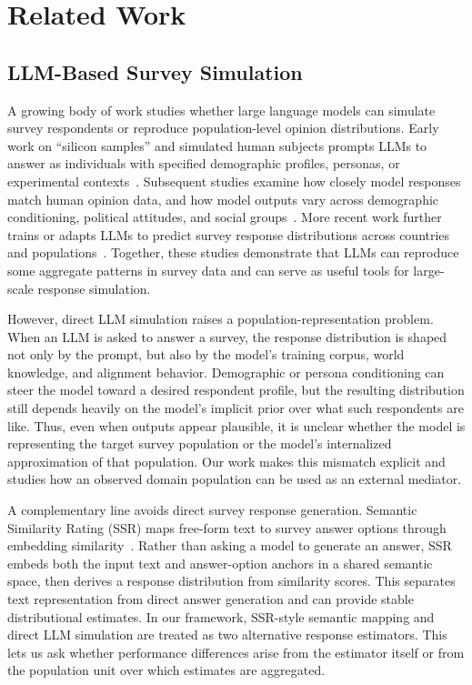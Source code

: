 \documentclass{article}
\begin{document}
\section{Related Work}

\subsection{LLM-Based Survey Simulation}

A growing body of work studies whether large language models can simulate
survey respondents or reproduce population-level opinion distributions.
Early work on ``silicon samples'' and simulated human subjects prompts LLMs
to answer as individuals with specified demographic profiles, personas, or
experimental contexts~\cite{aher2023using,argyle2023silicon}.
Subsequent studies examine how closely model responses match human opinion
data, and how model outputs vary across demographic conditioning, political
attitudes, and social groups~\cite{santurkar2023whose}.
More recent work further trains or adapts LLMs to predict survey response
distributions across countries and populations~\cite{yang2024specializing}.
Together, these studies demonstrate that LLMs can reproduce some aggregate
patterns in survey data and can serve as useful tools for large-scale
response simulation.

However, direct LLM simulation raises a population-representation problem.
When an LLM is asked to answer a survey, the response distribution is shaped
not only by the prompt, but also by the model's training corpus, world
knowledge, and alignment behavior.
Demographic or persona conditioning can steer the model toward a desired
respondent profile, but the resulting distribution still depends heavily on
the model's implicit prior over what such respondents are like.
Thus, even when outputs appear plausible, it is unclear whether the model is
representing the target survey population or the model's internalized
approximation of that population.
Our work makes this mismatch explicit and studies how an observed domain
population can be used as an external mediator.

A complementary line avoids direct survey response generation.
Semantic Similarity Rating (SSR) maps free-form text to survey answer options
through embedding similarity~\cite{maier2026llms}.
Rather than asking a model to generate an answer, SSR embeds both the input
text and answer-option anchors in a shared semantic space, then derives a
response distribution from similarity scores.
This separates text representation from direct answer generation and can
provide stable distributional estimates.
In our framework, SSR-style semantic mapping and direct LLM simulation are
treated as two alternative response estimators.
This lets us ask whether performance differences arise from the estimator
itself or from the population unit over which estimates are aggregated.
\end{document}
